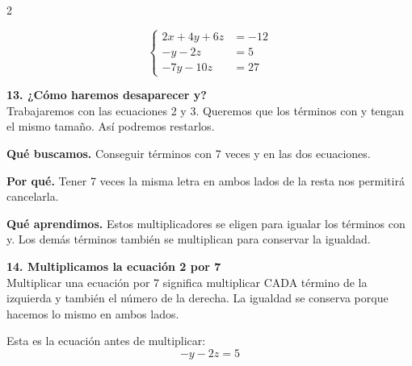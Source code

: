 \documentclass[11pt,a4paper,landscape]{article}
\begin{document}
\begin{multicols*}{2}
\begin{minipage}{\linewidth}
\[\left\{\begin{aligned}2x + 4y + 6z &= -12\\-y - 2z &= 5\\-7y - 10z &= 27\end{aligned}\right.\]
\end{minipage}\par\medskip
\noindent\begin{minipage}{\linewidth}\textbf{13. ¿Cómo haremos desaparecer y?}\\[2pt]Trabajaremos con las ecuaciones 2 y 3. Queremos que los términos con y tengan el mismo tamaño. Así podremos restarlos.
\par\smallskip\textbf{Qué buscamos.} Conseguir términos con 7 veces y en las dos ecuaciones.
\par\smallskip\textbf{Por qué.} Tener 7 veces la misma letra en ambos lados de la resta nos permitirá cancelarla.
\par{}\par\smallskip
\par\smallskip\textbf{Qué aprendimos.} Estos multiplicadores se eligen para igualar los términos con y. Los demás términos también se multiplican para conservar la igualdad.
\end{minipage}\par\medskip
\noindent\begin{minipage}{\linewidth}\textbf{14. Multiplicamos la ecuación 2 por 7}\\[2pt]Multiplicar una ecuación por 7 significa multiplicar CADA término de la izquierda y también el número de la derecha. La igualdad se conserva porque hacemos lo mismo en ambos lados.
\par\smallskip Esta es la ecuación antes de multiplicar:
\[-y - 2z = 5\]
\par{}\par\smallskip

\end{minipage}
\end{multicols*}
\end{document}
